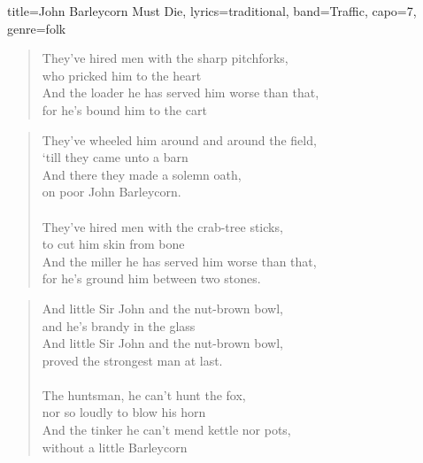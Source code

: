 \documentclass{article}
\begin{document}
\begin{song}{title={John Barleycorn Must Die}, lyrics={traditional}, band={Traffic}, capo={7}, genre={folk}}
\begin{verse}
		They've hired men with the sharp pitchforks, \\
		who pricked him to the heart \\
		And the loader he has served him worse than that, \\
		for he's bound him to the cart \\
	\end{verse}
	\begin{verse}
		They've wheeled him around and around the field, \\
		‘till they came unto a barn \\
		And there they made a solemn oath, \\
		on poor John Barleycorn. \\
		\\
		They've hired men with the crab-tree sticks, \\
		to cut him skin from bone \\
		And the miller he has served him worse than that, \\
		for he's ground him between two stones. \\
	\end{verse}
	\begin{verse}
		And little Sir John and the nut-brown bowl, \\
		and he's brandy in the glass \\
		And little Sir John and the nut-brown bowl, \\
		proved the strongest man at last. \\
		\\
		The huntsman, he can't hunt the fox, \\
		nor so loudly to blow his horn \\
		And the tinker he can't mend kettle nor pots, \\
		without a little Barleycorn \\
	\end{verse}
\end{song}
\end{document}
